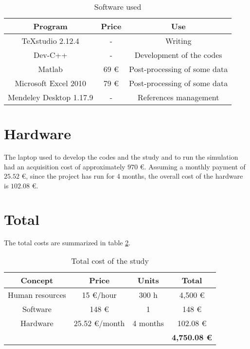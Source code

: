 \begin{table}[H]
	\centering
	\begin{tabular}{ |c|c|c| }
		\hline
		Program & Price & Use \\ \hline
		TeXstudio 2.12.4 & - & Writing \\ \hline
		Dev-C++ & - & Development of the codes \\ \hline
		Matlab & 69 € & Post-processing of some data \\ \hline
		Microsoft Excel 2010 & 79 € & Post-processing of some data \\ \hline
		Mendeley Desktop 1.17.9 & - & References management \\ \hline
	\end{tabular}
\caption{Software used}
\label{softw}
\end{table}

\section{Hardware}
The laptop used to develop the codes and the study and to run the simulation had an acquisition cost of approximately $970$ €. Assuming a monthly payment of $25.52$ €, since the project has run for 4 months, the overall cost of the hardware is $102.08$ €.


\section{Total}
The total costs are summarized in table \ref{TotalCost}.
\begin{table}[H]
	\centering
	\begin{tabular}{ccc|c|}
		\hline
		\multicolumn{1}{|c|}{Concept}         & \multicolumn{1}{c|}{Price}         & Units    & Total               \\ \hline
		\multicolumn{1}{|c|}{Human resources} & \multicolumn{1}{c|}{15 €/hour}     & 300 h    & 4,500 €             \\ \hline
		\multicolumn{1}{|c|}{Software}        & \multicolumn{1}{c|}{148 €}         & 1        & 148 €               \\ \hline
		\multicolumn{1}{|c|}{Hardware}        & \multicolumn{1}{c|}{25.52 €/month} & 4 months & 102.08 €            \\ \hline
		&                                    &          & \textbf{4,750.08 €} \\ \cline{4-4} 
	\end{tabular}
\caption{Total cost of the study}
\label{TotalCost}
\end{table}


